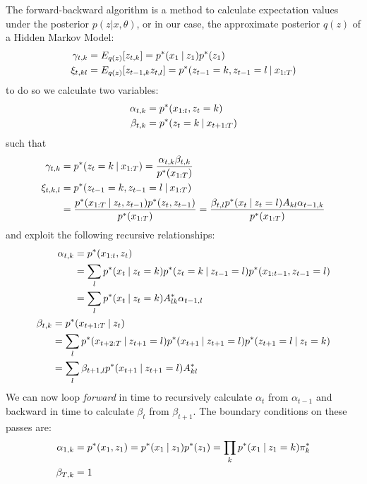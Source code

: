 The forward-backward algorithm is a method to calculate expectation values under the posterior $p(z | x, \theta)$, or in our case, the approximate posterior $q(z)$ of a Hidden Markov Model:  
\begin{align}
 \gamma_{t,k} 
  &= E_{q(z)} [z_{t,k}] 
   = p^*(x_1 \:|\: z_1) p^*(z_1) \\
 \xi_{t,kl} 
  &= E_{q(z)} [z_{t-1,k} z_{t,l}]
   = p^*(z_{t-1}=k, z_{t-1}=l \:|\: x_{1:T}) 
\end{align}
to do so we calculate two variables:
\begin{align}
 \alpha_{t,k} &= p^*(x_{1:t}, z_t=k) \\
 \beta_{t,k} &= p^*(z_t=k \:|\: x_{t+1:T})
\end{align}
such that
\begin{align}
  \gamma_{t,k} &= p^*(z_t=k \:|\: x_{1:T})
                = \frac{\alpha_{t,k} \beta_{t,k}}{p^*(x_{1:T})} \\
  \xi_{t,k,l} &= p^*(z_{t-1}=k, z_{t-1}=l \:|\: x_{1:T}) \\
              &= \frac{p^*(x_{1:T} \:|\: z_t, z_{t-1}) p^*(z_t, z_{t-1})}{p^*(x_{1:T})}
               = \frac{\beta_{t,l} p^*(x_t \:|\: z_t=l) A_{kl} \alpha_{t-1,k} }{p^*(x_{1:T})}
\end{align}
and exploit the following recursive relationships:
\begin{align}
  \begin{split}
    \alpha_{t,k} &= p^*(x_{1:t}, z_t) \\
                  &= \sum_l p^*(x_t \:|\: z_t=k) p^*(z_t=k \:|\: z_{t-1}=l) p^*(x_{1:t-1}, z_{t-1}=l) \\ 
                  &= \sum_l p^*(x_t \:|\: z_t=k) A^*_{lk} \alpha_{t-1,l}
  \end{split}\\ 
  \begin{split}
    \beta_{t,k} &= p^*(x_{t+1:T} \:|\: z_t) \\
                &= \sum_l  p^*(x_{t+2:T} \:|\: z_{t+1}=l) p^*(x_{t+1} \:|\: z_{t+1}=l) p^*(z_{t+1}=l \:|\: z_{t}=k)\\ 
                &= \sum_l  \beta_{t+1,l} p^*(x_{t+1} \:|\: z_{t+1}=l) A^*_{kl} 
  \end{split} 
\end{align}
We can now loop \emph{forward} in time to recursively calculate $\alpha_t$ from $\alpha_{t-1}$ and backward in time to calculate $\beta_t$ from $\beta_{t+1}$. The boundary conditions on these passes are:
\begin{align}
  \alpha_{1,k} &= p^*(x_1, z_1) = p^*(x_1 \:|\: z_1) p^*(z_1) =  \prod_k p^*(x_1 \:|\: z_1=k) \pi^*_k \\
  \beta_{T,k} &= 1
\end{align}
